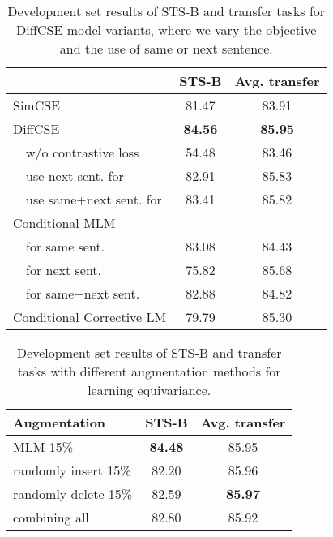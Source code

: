 \documentclass[11pt]{article}
\newcommand\tf[1]{\textbf{#1}}
\begin{document}
\begin{table}[t!]
    \begin{center}
    \centering
    \small
    \begin{tabular}{lcc}
    \toprule
         & \tf{STS-B} & \tf{Avg. transfer} \\
    \midrule
        SimCSE & 81.47 & 83.91 \\
    \midrule
        DiffCSE & \bf 84.56 & \bf 85.95\\
        ~~w/o contrastive loss & 54.48 & 83.46 \\
        ~~use next sent. for  & 82.91 & 85.83 \\
        ~~use same+next sent. for  & 83.41 & 85.82 \\
    \midrule
        Conditional MLM & & \\
        ~~for same sent. & 83.08 & 84.43 \\
        ~~for next sent. & 75.82 & 85.68 \\
        ~~for same+next sent. & 82.88 & 84.82 \\
    \midrule
        Conditional Corrective LM & 79.79 & 85.30 \\
    \bottomrule
    \end{tabular}
    \end{center}
\vspace{-3mm}
    \caption{
        Development set results of STS-B and transfer tasks for DiffCSE model variants, where we vary the objective and the use of same or next sentence.
    }
    \label{tab:ablation}
\vspace{-2mm}
\end{table}

\begin{table}[ht]
\centering
\small
\setlength\tabcolsep{3pt}
\begin{tabular}{lcc}
\toprule
\bf Augmentation               & \bf STS-B & \multicolumn{1}{c}{\bf Avg. transfer} \\
\midrule

MLM 15\%                   & \bf 84.48 & 85.95                                    \\
randomly insert 15\%         & 82.20 & 85.96                                    \\
randomly delete 15\%         & 82.59 & \bf 85.97                                    \\
combining all              & 82.80 & 85.92 \\
\bottomrule

\end{tabular}
\vspace{-2mm}
\caption{Development set results of STS-B and transfer tasks with different augmentation methods for learning equivariance.}
\label{tab:augments}
\vspace{-4mm}
\end{table}
\end{document}
